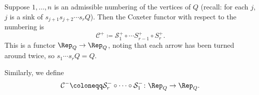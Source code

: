 Suppose $1, \ldots, n$ is an admissible numbering of the vertices of $Q$
(recall: for each $j$, $j$ is a sink of $s_{j+1}s_{j+2}\cdots s_rQ$).
Then the Coxeter functor with respect to the numbering is
\[ \mathcal{C}^+\coloneqq \mathcal{S}_1^+ \circ \cdots S_{r-1}^+ \circ S_r^+. \]
This is a functor $\Rep_Q\to \Rep_Q$, noting that each arrow has been turned around twice,
so $s_1\cdots s_rQ = Q$.

Similarly, we define
\[ \mathcal{C}^-\coloneqq \mathcal{S}_r^- \circ \cdots \circ \mathcal{S}_1^- \colon \Rep_Q\to \Rep_Q. \]
